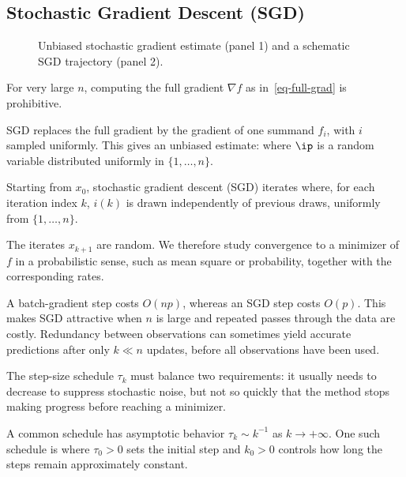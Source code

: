                                                         
\subsection{Stochastic Gradient Descent (SGD)}

\begin{figure}[tbp]
\centering
{}\hfill
{}
\caption{Unbiased stochastic gradient estimate (panel 1) and a schematic SGD trajectory (panel 2).}
\label{fig-review-advanced-unbiased-gradient}
\label{fig-review-advanced-sgd-trajectory}
\end{figure}
For very large $n$, computing the full gradient $\nabla f$ as in~\eqref{eq-full-grad} is prohibitive.  
 
SGD replaces the full gradient by the gradient of one summand $f_{i}$, with $i$ sampled uniformly. This gives an unbiased estimate:
where $\ip$ is a random variable distributed uniformly in $\{1,\ldots,n\}$.


Starting from $x_0$, stochastic gradient descent (SGD) iterates
where, for each iteration index $k$, $i(k)$
is drawn independently of previous draws, uniformly from $\{1,\ldots,n\}$.
 
The iterates $x_{k+1}$ are random. We therefore study convergence to a minimizer of $f$ in a probabilistic sense, such as mean square or probability, together with the corresponding rates.

A batch-gradient step costs $O(np)$,
whereas an SGD step costs $O(p)$. This makes SGD attractive
when $n$ is large and repeated passes through the data are costly.
Redundancy between observations can sometimes yield
accurate predictions after only $k \ll n$ updates, before all
observations have been used.

The step-size schedule $\tau_k$ must balance two requirements: it
usually needs to decrease to suppress stochastic noise,
but not so quickly that the method stops making progress
before reaching a minimizer.


A common schedule has asymptotic behavior $\tau_k \sim k^{-1}$
as $k\rightarrow +\infty$. One such schedule is
where $\tau_0>0$ sets the initial step and $k_0>0$ controls how long the steps remain approximately constant.

